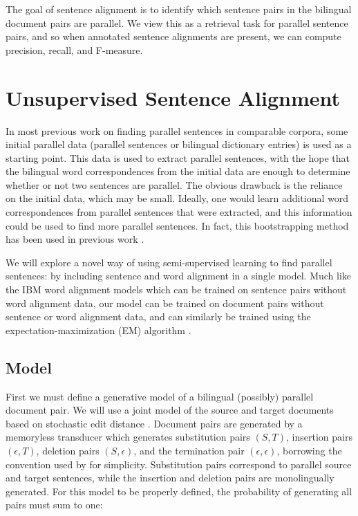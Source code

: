 \documentclass[11pt,letterpaper]{article}
\begin{document}
The goal of sentence alignment is to identify which sentence pairs in the
bilingual document pairs are parallel. We view this as a retrieval task for
parallel sentence pairs, and so when annotated sentence alignments are present,
we can compute precision, recall, and F-measure.

\section{Unsupervised Sentence Alignment}
\label{sec:alignment}
In most previous work on finding parallel sentences in comparable corpora, some
initial parallel data (parallel sentences or bilingual dictionary entries) is
used as a starting point. This data is used to extract parallel sentences, with
the hope that the bilingual word correspondences from the initial data are enough to
determine whether or not two sentences are parallel. The obvious drawback is
the reliance on the initial data, which may be small. Ideally, one would learn
additional word correspondences from parallel sentences that were extracted, and
this information could be used to find more parallel sentences. In fact, this
bootstrapping method has been used in previous work \cite{Fung04a,Fung04b,Wu05}.

We will explore a novel way of using semi-supervised learning to find
parallel sentences: by including sentence and word alignment in a single model.
Much like the IBM word alignment models \cite{Brown93} which can be trained on
sentence pairs without word alignment data, our model can be trained on document
pairs without sentence or word alignment data, and can similarly be trained using
the expectation-maximization (EM) algorithm \cite{Dempster77}.

\subsection{Model}

First we must define a generative model of a bilingual (possibly) parallel
document pair. We will use a joint model of the source and target documents
based on stochastic edit distance \cite{Ristad98}. Document pairs are
generated by a memoryless transducer which generates substitution pairs $(S,T)$,
insertion pairs $(\epsilon, T)$, deletion pairs $(S,\epsilon)$, and the
termination pair $(\epsilon, \epsilon)$, borrowing the convention used by
\cite{Oncina06} for simplicity. Substitution pairs correspond to parallel
source and target sentences, while the insertion and deletion pairs are
monolingually generated. For this model to be properly defined, the probability
of generating all pairs must sum to one:
\end{document}
